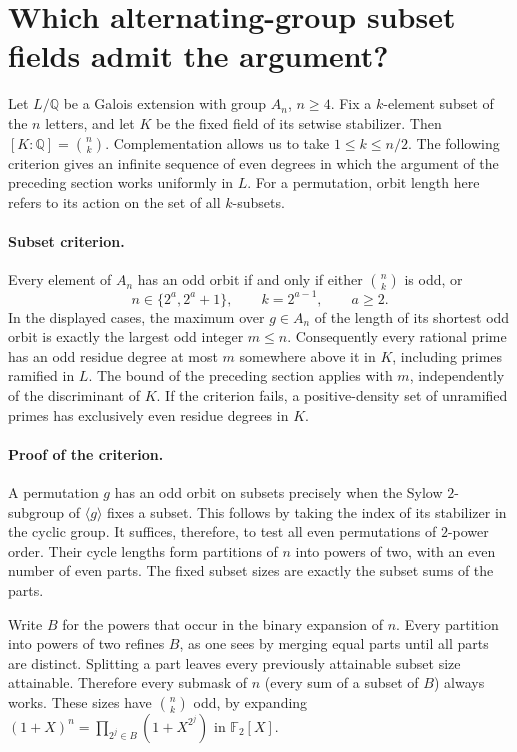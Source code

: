 \section{Which alternating-group subset fields admit the argument?}
\label{sec:subsets}

Let $L/\mathbb Q$ be a Galois extension with group $A_n$, $n\ge4$. Fix
a $k$-element subset of the $n$ letters, and let $K$ be the fixed field
of its setwise stabilizer. Then $[K:\mathbb Q]=\binom nk$. Complementation
allows us to take $1\le k\le n/2$. The following criterion gives an infinite
sequence of even degrees in which the argument of the preceding section works
uniformly in $L$. For a permutation, orbit length here refers to its action
on the set of all $k$-subsets.

\paragraph{Subset criterion.}
Every element of $A_n$ has an odd orbit if and only if either
$\binom nk$ is odd, or
\[
       n\in\{2^a,2^a+1\},\qquad k=2^{a-1},\qquad a\ge2.
\]
In the displayed cases, the maximum over $g\in A_n$ of the length of its
shortest odd orbit is exactly the largest odd integer $m\le n$.
Consequently every rational prime has an odd residue degree at most $m$
somewhere above it in $K$, including primes ramified in $L$.
The bound of the preceding section applies with $m$, independently of
the discriminant of $K$. If the criterion fails, a positive-density set
of unramified primes has exclusively even residue degrees in $K$.

\paragraph{Proof of the criterion.}
A permutation $g$ has an odd orbit on subsets precisely when the Sylow
$2$-subgroup of $\langle g\rangle$ fixes a subset. This follows by taking
the index of its stabilizer in the cyclic group. It suffices, therefore, to
test all even permutations of $2$-power order. Their cycle lengths form
partitions of $n$ into powers of two, with an even number of even parts.
The fixed subset sizes are exactly the subset sums of the parts.

Write $B$ for the powers that occur in the binary expansion of $n$.
Every partition into powers of two refines $B$, as one sees by merging
equal parts until all parts are distinct. Splitting a part leaves every
previously attainable subset size attainable. Therefore every submask of
$n$ (every sum of a subset of $B$) always works. These sizes have
$\binom nk$ odd, by expanding $(1+X)^n=\prod_{2^j\in B}(1+X^{2^j})$
in $\mathbb F_2[X]$.

